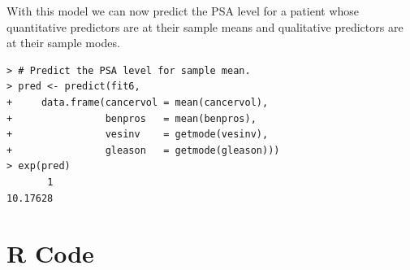 \documentclass[12pt,letterpaper,titlepage,en-US]{article}
\begin{document}
With this model we can now predict the PSA level for a patient whose quantitative predictors are at their sample means and qualitative predictors are at their sample modes.
\begin{lstlisting}
> # Predict the PSA level for sample mean.
> pred <- predict(fit6,
+     data.frame(cancervol = mean(cancervol),
+                benpros   = mean(benpros),
+                vesinv    = getmode(vesinv),
+                gleason   = getmode(gleason)))
> exp(pred)
       1
10.17628
\end{lstlisting}

\pagebreak

\section{R Code}

\end{document}
